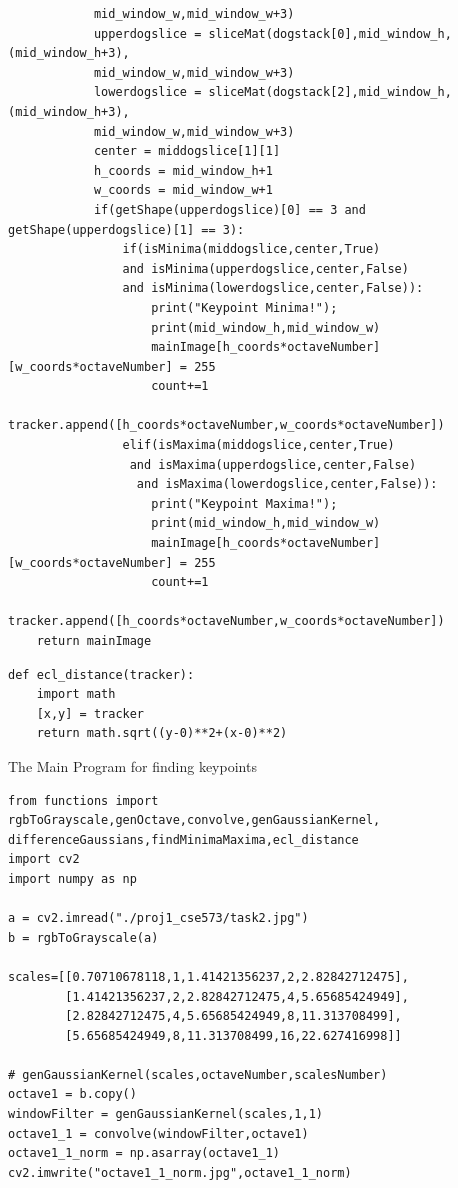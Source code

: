 \documentclass[12pt]{article}
\newenvironment{QandA}
{
	\begin{enumerate}[label=\normalfont\arabic*.,leftmargin=2em,rightmargin=2em]\normalfont
	}
	{
	\end{enumerate}
}
\newenvironment{codelalala}{}{}
\newenvironment{answered}{\setlength{\parindent}{1em}\par\normalfont}{}
\begin{document}
\begin{QandA}
\begin{answered}
\begin{codelalala}
\begin{verbatim}
            mid_window_w,mid_window_w+3)
            upperdogslice = sliceMat(dogstack[0],mid_window_h,(mid_window_h+3),
            mid_window_w,mid_window_w+3)
            lowerdogslice = sliceMat(dogstack[2],mid_window_h,(mid_window_h+3),
            mid_window_w,mid_window_w+3)
            center = middogslice[1][1]
            h_coords = mid_window_h+1
            w_coords = mid_window_w+1
            if(getShape(upperdogslice)[0] == 3 and getShape(upperdogslice)[1] == 3):
                if(isMinima(middogslice,center,True) 
                and isMinima(upperdogslice,center,False) 
                and isMinima(lowerdogslice,center,False)):
                    print("Keypoint Minima!");
                    print(mid_window_h,mid_window_w)
                    mainImage[h_coords*octaveNumber][w_coords*octaveNumber] = 255
                    count+=1
                    tracker.append([h_coords*octaveNumber,w_coords*octaveNumber])
                elif(isMaxima(middogslice,center,True)
                 and isMaxima(upperdogslice,center,False)
                  and isMaxima(lowerdogslice,center,False)):
                    print("Keypoint Maxima!");
                    print(mid_window_h,mid_window_w)
                    mainImage[h_coords*octaveNumber][w_coords*octaveNumber] = 255
                    count+=1
                    tracker.append([h_coords*octaveNumber,w_coords*octaveNumber])             
    return mainImage
\end{verbatim}
\begin{verbatim}
def ecl_distance(tracker):
    import math
    [x,y] = tracker
    return math.sqrt((y-0)**2+(x-0)**2)
\end{verbatim}
The Main Program for finding keypoints
\begin{verbatim}
from functions import rgbToGrayscale,genOctave,convolve,genGaussianKernel,
differenceGaussians,findMinimaMaxima,ecl_distance
import cv2
import numpy as np

a = cv2.imread("./proj1_cse573/task2.jpg")
b = rgbToGrayscale(a)

scales=[[0.70710678118,1,1.41421356237,2,2.82842712475],
        [1.41421356237,2,2.82842712475,4,5.65685424949],
        [2.82842712475,4,5.65685424949,8,11.313708499],
        [5.65685424949,8,11.313708499,16,22.627416998]]

# genGaussianKernel(scales,octaveNumber,scalesNumber)
octave1 = b.copy()
windowFilter = genGaussianKernel(scales,1,1)
octave1_1 = convolve(windowFilter,octave1)
octave1_1_norm = np.asarray(octave1_1)
cv2.imwrite("octave1_1_norm.jpg",octave1_1_norm)


\end{verbatim}
\end{codelalala}
\end{answered}
\end{QandA}
\end{document}
